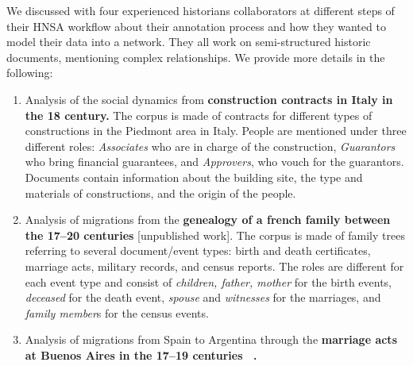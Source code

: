 We discussed with four experienced historians collaborators at different steps of their HNSA workflow about their annotation process and how they wanted to model their data into a network.
They all work on semi-structured historic documents, mentioning complex relationships.
We provide more details in the following:

\newcommand{\pascal}{\#1\xspace}
\newcommand{\nicole}{\#2\xspace}
\newcommand{\zacarias}{\#3\xspace}
\newcommand{\dana}{\#4\xspace}
\newcommand{\myindent}{~~} %
\begin{enumerate}[nosep,leftmargin=*]
    \item Analysis of the social dynamics from \textbf{construction contracts in Italy in the 18 century\cite{Cristofoli2018, Rolla2018}.}
    The corpus is made of contracts for different types of constructions in the Piedmont area in Italy. People are mentioned under three different roles: \textit{Associates} who are in charge of the construction, \textit{Guarantors} who bring financial guarantees, and \textit{Approvers}, who vouch for the guarantors. Documents contain information about the building site, the type and materials of constructions, and the origin of the people.
    \item Analysis of migrations from the \textbf{genealogy of a french family between the 17--20 centuries} [unpublished work].
    The corpus is made of family trees referring to several document/event types: birth and death certificates, marriage acts, military records, and census reports.
    The roles are different for each event type and consist of \textit{children, father, mother} for the birth events, \textit{deceased} for the death event, \textit{spouse} and \textit{witnesses} for the marriages, and \textit{family member}s for the census events.
    \item Analysis of migrations from Spain to Argentina through the \textbf{marriage acts at Buenos Aires in the 17--19 centuries ~\cite{moutoukiasBuenosAiresPort2016, rueda1989matrimonios}.}

\end{enumerate}

